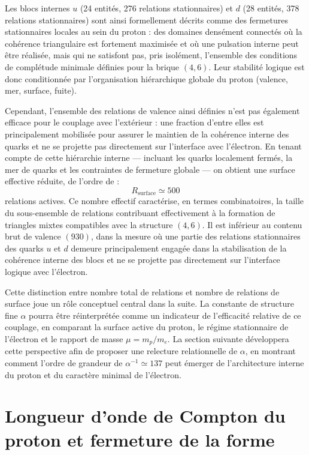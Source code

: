 \documentclass[11pt,a4paper]{article}
\begin{document}
Les blocs internes \(u\) (24 entités, 276 relations stationnaires) et \(d\) (28 entités, 378 relations stationnaires) sont ainsi formellement décrits comme des fermetures stationnaires locales au sein du proton : des domaines densément connectés où la cohérence triangulaire est fortement maximisée et où une pulsation interne peut être réalisée, mais qui ne satisfont pas, pris isolément, l’ensemble des conditions de complétude minimale définies pour la brique \(\left(4,6\right)\). Leur stabilité logique est donc conditionnée par l’organisation hiérarchique globale du proton (valence, mer, surface, fuite).

Cependant, l’ensemble des relations de valence ainsi définies n’est pas également efficace pour le couplage avec l’extérieur : une fraction d’entre elles est principalement mobilisée pour assurer le maintien de la cohérence interne des quarks et ne se projette pas directement sur l’interface avec l’électron. En tenant compte de cette hiérarchie interne — incluant les quarks localement fermés, la mer de quarks et les contraintes de fermeture globale — on obtient une surface effective réduite, de l’ordre de :
\[
R_{\mathrm{surface}} \simeq 500
\]
relations actives. Ce nombre effectif caractérise, en termes combinatoires, la taille du sous-ensemble de relations contribuant effectivement à la formation de triangles mixtes compatibles avec la structure \(\left(4,6\right)\). Il est inférieur au contenu brut de valence \(\left(930\right)\), dans la mesure où une partie des relations stationnaires des quarks \(u\) et \(d\) demeure principalement engagée dans la stabilisation de la cohérence interne des blocs et ne se projette pas directement sur l’interface logique avec l’électron.

Cette distinction entre nombre total de relations et nombre de relations de surface joue un rôle conceptuel central dans la suite. La constante de structure fine \(\alpha\) pourra être réinterprétée comme un indicateur de l’efficacité relative de ce couplage, en comparant la surface active du proton, le régime stationnaire de l’électron et le rapport de masse \(\mu = m_p/m_e\). La section suivante développera cette perspective afin de proposer une relecture relationnelle de \(\alpha\), en montrant comment l’ordre de grandeur de \(\alpha^{-1} \simeq 137\) peut émerger de l’architecture interne du proton et du caractère minimal de l’électron.

\section{Longueur d’onde de Compton du proton et fermeture de la forme}
\end{document}
